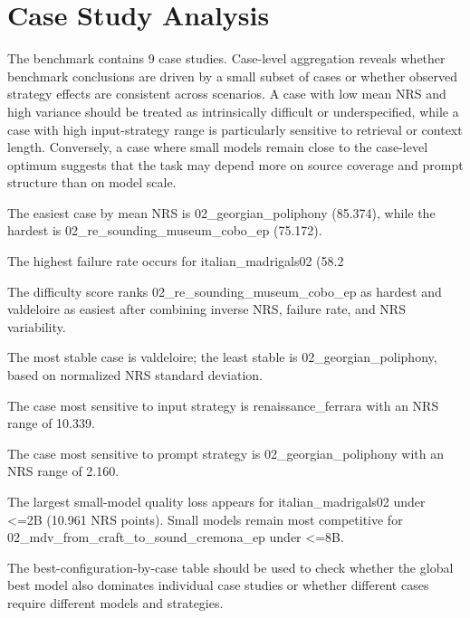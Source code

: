 \documentclass{article}
\begin{document}
\section{Case Study Analysis}
The benchmark contains 9 case studies. Case-level aggregation reveals whether benchmark conclusions are driven by a small subset of cases or whether observed strategy effects are consistent across scenarios. A case with low mean NRS and high variance should be treated as intrinsically difficult or underspecified, while a case with high input-strategy range is particularly sensitive to retrieval or context length. Conversely, a case where small models remain close to the case-level optimum suggests that the task may depend more on source coverage and prompt structure than on model scale.


The easiest case by mean NRS is 02\_georgian\_poliphony (85.374), while the hardest is 02\_re\_sounding\_museum\_cobo\_ep (75.172).


The highest failure rate occurs for italian\_madrigals02 (58.2%


The difficulty score ranks 02\_re\_sounding\_museum\_cobo\_ep as hardest and valdeloire as easiest after combining inverse NRS, failure rate, and NRS variability.


The most stable case is valdeloire; the least stable is 02\_georgian\_poliphony, based on normalized NRS standard deviation.


The case most sensitive to input strategy is renaissance\_ferrara with an NRS range of 10.339.


The case most sensitive to prompt strategy is 02\_georgian\_poliphony with an NRS range of 2.160.


The largest small-model quality loss appears for italian\_madrigals02 under <=2B (10.961 NRS points). Small models remain most competitive for 02\_mdv\_from\_craft\_to\_sound\_cremona\_ep under <=8B.


The best-configuration-by-case table should be used to check whether the global best model also dominates individual case studies or whether different cases require different models and strategies.
\end{document}
